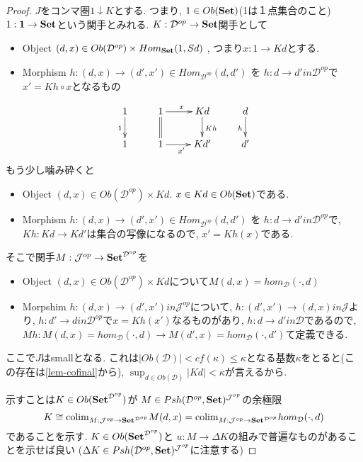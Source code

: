 \documentclass[dvipdfmx,a4paper,11pt]{article}
\newcommand{\colim}{{\rm colim}}
\theoremstyle{definition}
\begin{document}
\begin{proof}
$J$をコンマ圏$1 \downarrow K$とする.
つまり,
$1 \in Ob({\bf Set})$(1は１点集合のこと)
$1 :  {\bf 1} \to {\bf Set}$という関手とみれる. 
$K : \mathcal{D}^{op} \to {\bf Set}$関手として
\begin{itemize}
\item Object $(d,x) \in Ob(\mathcal{D}^{op}) \times Hom_{{\bf Set}}(1, Sd)$ , つまり$x : 1 \to Kd$とする. 
\item Morphism $h : (d,x)  \to (d',x') \in Hom_{\mathcal{D}^{op}}(d,d') $ を 
$h: d \to d' in \mathcal{D}^{op}$で$x'  = Kh \circ x$となるもの
\end{itemize}

\begin{equation*}
\xymatrix@C=25pt@R=20pt{
1 \ar@{->}[d] _{1}&1\ar@{=}[d] \ar@{->}[r]^{x} & Kd\ar@{->}[d]^{Kh} &d\ar@{->}[d]_{h}\\
1&1\ar@{->}[r]_{x'} &Kd'&d' \\   
}
\end{equation*}
もう少し噛み砕くと
\begin{itemize}
\item Object $(d,x) \in Ob(\mathcal{D}^{op}) \times Kd$. $x \in Kd \in Ob({\bf Set})$である.
\item Morphism $h : (d,x)  \to (d',x') \in Hom_{\mathcal{D}^{op}}(d,d')$ を
$h: d \to d' in \mathcal{D}^{op}$で, $Kh : Kd \to Kd'$は集合の写像になるので, $x' = Kh(x)$である. 
\end{itemize}

そこで関手$M : \mathcal{J}^{op} \to {\bf Set }^{\mathcal{D}^{op}}$を
\begin{itemize}
\item Object $(d,x) \in Ob(\mathcal{D}^{op}) \times Kd$について$M(d,x) = hom_{\mathcal{D}}(\cdot, d)$
\item Morpshim $h : (d,x)  \to (d',x') in \mathcal{J}^{op} $について, 
$h : (d',x') \to (d,x) in \mathcal{J}$より, 
$h : d'  \to d in \mathcal{D}^{op}$で$x = Kh(x')$なるものがあり, 
$h : d \to d' in \mathcal{D} $であるので, 
$Mh :  M(d,x) = hom_{\mathcal{D}}( \cdot, d) \to  M(d',x) = hom_{\mathcal{D}}(\cdot, d') $て定義できる. 
\end{itemize}

ここで$J$はsmallとなる.
 これは$|Ob(\mathcal{D})| < cf(\kappa) \le \kappa$となる基数$\kappa$をとると(この存在は\ref{lem-cofinal}から), $\sup_{d \in Ob(\mathcal{D})} |Kd| < \kappa$が言えるから. 

示すことは$K \in Ob({\bf Set}^{\mathcal{D}^{op}})$が
$M \in Psh(\mathcal{D}^{op},{\bf Set})^{\mathcal{J}^{op}}$の余極限
$$
K \cong  \colim_{M : \mathcal{J}^{op} \to {\bf Set }^{\mathcal{D}^{op}}}M(d,x)
=\colim_{M : \mathcal{J}^{op} \to {\bf Set }^{\mathcal{D}^{op}}} hom_{\mathcal{D}}(\cdot, d)
$$
であることを示す. 
$K \in Ob({\bf Set}^{\mathcal{D}^{op}})$と $u: M \to \Delta K$の組みで普遍なものがあることを示せば良い
($\Delta K \in Psh(\mathcal{D}^{op},{\bf Set})^{\mathcal{J}^{op}}$に注意する)


\end{proof}
\end{document}
